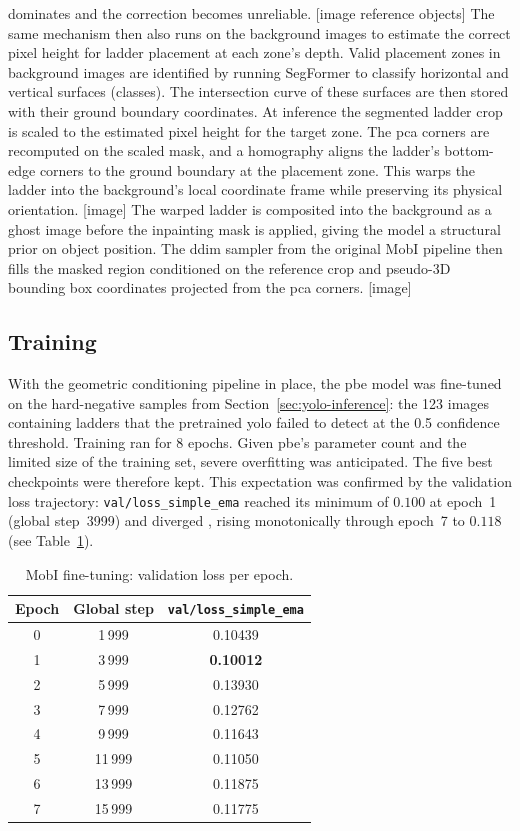 dominates and the correction becomes unreliable. 
[image reference objects]
The same mechanism then also runs on the background images to estimate the correct pixel height for ladder placement at each zone's depth. 
Valid placement zones in background images are identified by running SegFormer\cite{segformer} to classify horizontal and vertical surfaces (classes). 
The intersection curve of these surfaces are then stored with their ground boundary coordinates.
At inference the segmented ladder crop is scaled to the estimated pixel height for the target zone. 
The \gls{pca} corners are recomputed on the scaled mask, and a homography aligns the ladder's bottom-edge corners to the ground boundary at the placement zone. 
This warps the ladder into the background's local coordinate frame while preserving its physical orientation. 
[image]
The warped ladder is composited into the background as a ghost image before the inpainting mask is applied, giving the model a structural prior on 
object position. The \gls{ddim} sampler from the original MobI\cite{mobi} pipeline then fills the masked region conditioned on the reference crop and pseudo-3D bounding 
box coordinates projected from the \gls{pca} corners.
[image]

\subsection*{Training}
With the geometric conditioning pipeline in place, the \gls{pbe} model was fine-tuned on the 
hard-negative samples from Section~\ref{sec:yolo-inference}: the 123 images containing ladders that the pretrained \gls{yolo} failed to detect at the 0.5 confidence threshold. 
Training ran for 8 epochs. Given \gls{pbe}'s parameter count and the limited size of the training set, severe overfitting was anticipated. The five best checkpoints were therefore kept. 
This expectation was confirmed by the validation loss trajectory: \texttt{val/loss\_simple\_ema} 
reached its minimum of $0.100$ at epoch~1 (global step~3999) and diverged , 
rising monotonically through epoch~7 to $0.118$ (see Table~\ref{tab:mobi-training}).

\begin{table}[!htbp]
  \centering
  \caption{MobI fine-tuning: validation loss per epoch.}
  \label{tab:mobi-training}
  \begin{tabular}{@{} c c c @{}}
    \toprule
    Epoch & Global step & \texttt{val/loss\_simple\_ema} \\
    \midrule
    0 & 1\,999  & 0.10439 \\
    1 & 3\,999  & \textbf{0.10012} \\
    2 & 5\,999  & 0.13930 \\
    3 & 7\,999  & 0.12762 \\
    4 & 9\,999  & 0.11643 \\
    5 & 11\,999 & 0.11050 \\
    6 & 13\,999 & 0.11875 \\
    7 & 15\,999 & 0.11775 \\
    \bottomrule
  \end{tabular}
\end{table}

